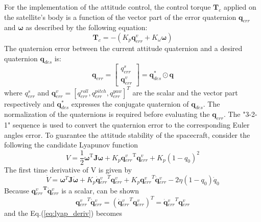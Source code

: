 \documentclass[journal]{new-aiaa}
\begin{document}
For the implementation of the attitude control, the control torque $\textbf{T}_c$ applied on the satellite's body is a function of the vector part of the error quaternion $\textbf{q}_{err}$ and $\boldsymbol{\omega}$ as described by the following equation:
\begin{equation}
\textbf{T}_c=-(K_p\textbf{q}_{err}^v+
K_{\omega}\boldsymbol{\omega})
\end{equation}
The quaternion error between the current attitude quaternion and a desired quaternion $\textbf{q}_{des}$ is: 
\begin{equation}
\textbf{q}_{err}=
\begin{bmatrix}
q_{err}^s\\
\textbf{q}_{err}^v
\end{bmatrix}=\textbf{q}^*_{des}\odot\textbf{q}
\end{equation}
where $q_{err}^s$ and $\textbf{q}_{err}^v=[q_{err}^{roll}, q_{err}^{pitch}, q_{err}^{yaw}]^T$ are the scalar and the vector part respectively and $\textbf{q}^*_{des}$ expresses the conjugate quaternion of $\textbf{q}_{des}$. The normalization of the quaternions is required before evaluating the $\textbf{q}_{err}$. The "3-2-1" sequence is used to convert the quaternion error to the corresponding Euler angles error.
To guarantee the attitude stability of the spacecraft, consider the following the candidate Lyapunov function \cite{Junkins_Schaub_2009,feedbackwie,Xueqin2011}
\begin{equation}
V=\frac{1}{2} \boldsymbol{\omega}^{\mathrm{T}} \mathbf{J} \boldsymbol{\omega}+K_p \mathbf{q}{_{err}^v}^{\mathrm{T}} \mathbf{q}{_{err}^v}+K_p\left(1-q_0\right)^{2}
\end{equation}
The first time derivative of V is given by
\begin{equation}
\dot{V}=\boldsymbol{\omega}^{{T}} \mathbf{J}\dot{\boldsymbol{\omega}}+K_p 
\dot{\textbf{q}}{_{err}^v}^T
\mathbf{q}{_{err}^v}+K_p \mathbf{q}{_{err}^v}^{{T}} \dot{\textbf{q}}{_{err}^v}
-2 \eta\left(1-q_0\right) \dot{q}_{0}
\label{eq:lyap_deriv}
\end{equation}
Because $\mathbf{q}{_{err}^v}^{\mathbf{T}} \dot{\textbf{q}}{_{err}^v}$ is a scalar, can be shown
\begin{equation}
\mathbf{q}{_{err}^v}^{{T}} \dot{\textbf{q}}{_{err}^v}
=
\left(\dot{\textbf{q}}{_{err}^v}^T
\mathbf{q}{_{err}^v}\right)^{{T}}
=
\dot{\textbf{q}}{_{err}^v}^T
\mathbf{q}{_{err}^v}
\end{equation}
and the Eq.(\ref{eq:lyap_deriv}) becomes
\end{document}
